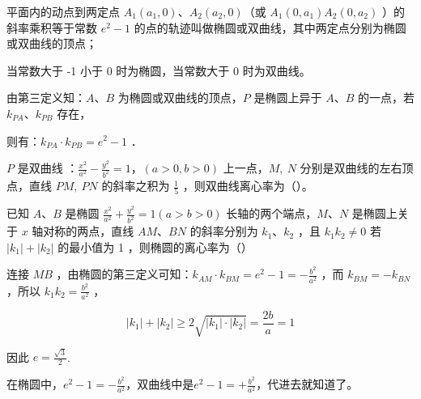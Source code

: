 \begin{definition}
    平面内的动点到两定点 $A_1\left(a_1, 0\right)$、$A_2\left(a_2, 0\right)$（或 $A_1\left(0, a_1\right) A_2\left(0, a_2\right)$ ）的斜率乘积等于常数 $e^2-1$ 的点的轨迹叫做椭圆或双曲线，其中两定点分别为椭圆或双曲线的顶点；
\end{definition}

\begin{theorem}
    当常数大于 -1 小于 0 时为椭圆，当常数大于 0 时为双曲线。

    由第三定义知：$A$、$B$ 为椭圆或双曲线的顶点，$P$ 是椭圆上异于 $A$、$B$ 的一点，若 $k_{P A}$、$k_{P B}$ 存在，

    则有：$k_{P A} \cdot k_{P B}=e^2-1$ ．
\end{theorem}

\begin{example}
    $P$ 是双曲线 ：$\frac{x^2}{a^2}-\frac{y^2}{b^2}=1$，$(a>0, b>0)$ 上一点，$M, ~ N$ 分别是双曲线的左右顶点，直线 $P M, ~ P N$ 的斜率之积为 $\frac{1}{5}$ ，则双曲线离心率为（\hspace{2em}）。
\end{example}

\begin{example}
    已知 $A$、$B$ 是椭圆 $\frac{x^2}{a^2}+\frac{y^2}{b^2}=1(a>b>0)$ 长轴的两个端点，$M$、$N$ 是椭圆上关于 $x$ 轴对称的两点，直线 $A M$、$B N$ 的斜率分别为 $k_1$、$k_2$ ，且 $k_1 k_2 \neq 0$ 若 $\left|k_1\right|+\left|k_2\right|$ 的最小值为 1 ，则椭圆的离心率为（\hspace{2em}）

    \begin{figure} [H]
        \centering
        \resizebox{0.3\textwidth}{!}{}
    \end{figure}

\end{example}


\begin{solution}
    连接 $M B$ ，由椭圆的第三定义可知：$k_{A M} \cdot k_{B M}=e^2-1=-\frac{b^2}{a^2}$ ，而 $k_{B M}=-k_{B N}$ ，所以 $k_1 k_2=\frac{b^2}{a^2}$ ，

    $$
        \left|k_1\right|+\left|k_2\right| \geq 2 \sqrt{\left|k_1\right| \cdot\left|k_2\right|}=\frac{2 b}{a}=1
    $$

    因此 $e=\frac{\sqrt{3}}{2}$.

    \begin{note}
        在椭圆中，$ e^2-1 = - \frac{b^2}{a^2}$，双曲线中是$ e^2-1 = + \frac{b^2}{a^2}$，代进去就知道了。
    \end{note}
\end{solution}

